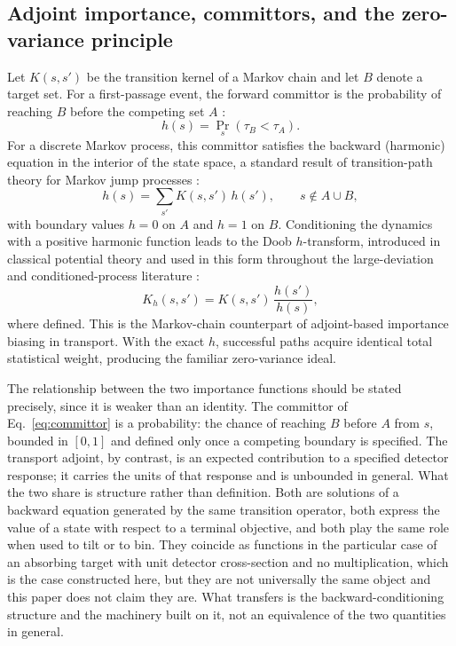 \documentclass[a4paper,fleqn]{cas-sc}
\begin{document}
\subsection{Adjoint importance, committors, and the zero-variance principle}\label{sec:adjoint}
Let $K(s,s')$ be the transition kernel of a Markov chain and let $B$ denote a target set.
For a first-passage event, the forward committor is the probability of reaching $B$ before
the competing set $A$ \citep{e2006,metzner2009}:
\begin{equation}
h(s)=\Pr_{s}\!\left(\tau_B<\tau_A\right).
\label{eq:committor}
\end{equation}
For a discrete Markov process, this committor satisfies the backward (harmonic) equation in
the interior of the state space, a standard result of transition-path theory for Markov jump
processes \citep{e2006,metzner2009,vandeneijnden2010}:
\begin{equation}
h(s)=\sum_{s'}K(s,s')\,h(s'),\qquad s\notin A\cup B,
\label{eq:harmonic}
\end{equation}
with boundary values $h=0$ on $A$ and $h=1$ on $B$. Conditioning the dynamics with a
positive harmonic function leads to the Doob $h$-transform, introduced in classical potential
theory \citep{doob1984} and used in this form throughout the large-deviation and
conditioned-process literature \citep{touchette2009,chetrite2015}:
\begin{equation}
K_h(s,s')=K(s,s')\,\frac{h(s')}{h(s)},
\label{eq:doob}
\end{equation}
where defined. This is the Markov-chain counterpart of adjoint-based importance biasing in
transport. With the exact $h$, successful paths acquire identical total statistical weight,
producing the familiar zero-variance ideal.

The relationship between the two importance functions should be stated precisely, since it is
weaker than an identity. The committor of Eq.~\eqref{eq:committor} is a probability: the chance
of reaching $B$ before $A$ from $s$, bounded in $[0,1]$ and defined only once a competing
boundary is specified. The transport adjoint, by contrast, is an expected contribution to a
specified detector response; it carries the units of that response and is unbounded in
general. What the two share is structure rather than definition. Both are solutions of a
backward equation generated by the same transition operator, both express the value of a state
with respect to a terminal objective, and both play the same role when used to tilt or to bin.
They coincide as functions in the particular case of an absorbing target with unit detector
cross-section and no multiplication, which is the case constructed here, but they are not
universally the same object and this paper does not claim they are. What transfers is the
backward-conditioning structure and the machinery built on it, not an equivalence of the two
quantities in general.
\end{document}
